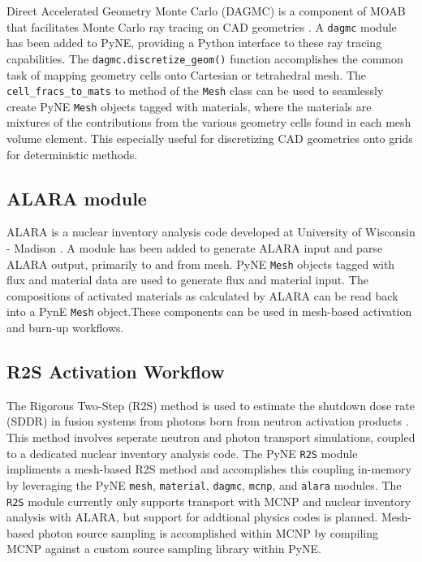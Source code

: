 \documentclass{anstrans}
\begin{document}
Direct Accelerated Geometry Monte Carlo (DAGMC) is a component of MOAB that
facilitates Monte Carlo ray tracing on CAD geometries
\cite{tautges_acceleration_2009}.  A \texttt{dagmc} module has been added to
PyNE, providing a Python interface to these ray tracing capabilities. The
\texttt{dagmc.discretize\_geom()} function accomplishes the common task of
mapping geometry cells onto Cartesian or tetrahedral mesh. The
\texttt{cell\_fracs\_to\_mats} to method of the \texttt{Mesh} class can be used
to seamlessly create PyNE \texttt{Mesh} objects tagged with materials, where the
materials are mixtures of the contributions from the various geometry cells
found in each mesh volume element. This especially useful for discretizing CAD
geometries onto grids for deterministic methods.



\subsection{ALARA module}

ALARA is a nuclear inventory analysis code developed at University of Wisconsin
- Madison \cite{wilson_validation_1998}. A module has been added to generate
  ALARA input and parse ALARA output, primarily to and from mesh. PyNE
\texttt{Mesh} objects tagged with flux and material data are used to generate
flux and material input. The compositions of activated materials as calculated by
ALARA can be read back into a PynE \texttt{Mesh} object.These components can be used
in mesh-based activation and burn-up workflows.

\subsection{R2S Activation Workflow}

The Rigorous Two-Step (R2S) method is used to estimate the shutdown dose rate
(SDDR) in fusion systems from photons born from neutron activation products
\cite{chen_rigorous_2002}. This method involves seperate neutron and photon
transport simulations, coupled to a dedicated nuclear inventory analysis code.
The PyNE \texttt{R2S} module impliments a mesh-based R2S method and
accomplishes this coupling in-memory by leveraging the PyNE \texttt{mesh},
\texttt{material}, \texttt{dagmc}, \texttt{mcnp}, and \texttt{alara} modules.
The \texttt{R2S} module currently only supports transport with MCNP and nuclear
inventory analysis with ALARA, but support for addtional physics codes is
planned. Mesh-based photon source sampling is accomplished within MCNP by
compiling MCNP against a custom source sampling library within PyNE.
\end{document}
